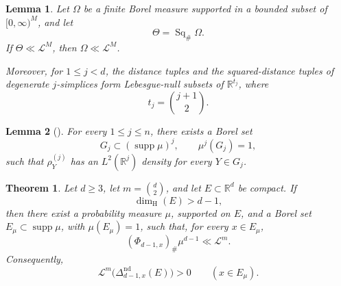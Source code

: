\documentclass[10pt,a4paper]{amsart}
\newtheorem{theorem}{Theorem}
\newtheorem{lemma}{Lemma}
\newcommand{\R}{\mathbb R}
\newcommand{\cL}{\mathcal L}
\newcommand{\supp}{\operatorname{supp}}
\begin{document}
\begin{lemma}
\label{lem:squaring-ac}
Let \(\Omega\) be a finite Borel measure supported in a bounded subset
of \([0,\infty)^M\), and let
\[
        \Theta=\operatorname{Sq}_\#\Omega.
\]
If \(\Theta\ll\cL^M\), then \(\Omega\ll\cL^M\).

Moreover, for \(1\leq j<d\), the distance tuples and the
squared-distance tuples of degenerate \(j\)-simplices form
Lebesgue-null subsets of \(\R^{t_j}\), where
\[
        t_j=\binom{j+1}{2}.
\]
\end{lemma}

\begin{lemma}[]
\label{lem:codim-marginal-descent}
For every $1\le j\le n$, there exists a Borel set
\[
G_j\subset (\operatorname{supp}\mu)^j,
\qquad
\mu^j(G_j)=1,
\]
such that $\rho_Y^{(j)}$ has an $L^2(\mathbb R^j)$ density for every
$Y\in G_j$.
\end{lemma}

\begin{theorem}\label{thm:euclidean-codim-one}
Let \(d\geq3\), let \(m=\binom d2\), and let \(E\subset\R^d\) be
compact.  If
\[
        \dim_{\mathrm H}(E)>d-1,
\]
then there exist a probability measure \(\mu\), supported on \(E\),
and a Borel set \(E_\mu\subset\supp\mu\), with \(\mu(E_\mu)=1\), such
that, for every \(x\in E_\mu\),
\[
        (\Phi_{d-1,x})_\#\mu^{d-1}\ll\cL^m.
\]
Consequently,
\[
        \cL^m\bigl(\Delta_{d-1,x}^{\mathrm{nd}}(E)\bigr)>0
        \qquad (x\in E_\mu).
\]
\end{theorem}
\end{document}

